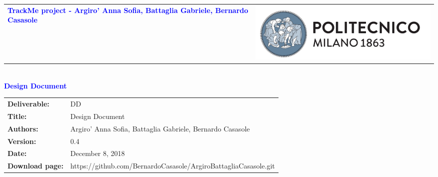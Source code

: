 




\begin{titlepage}


{\begin{table}[t!]
\centering
\begin{tabu} to \textwidth { X[1.3,r,p] X[1.7,l,p] }
\textcolor{Blue}{\textbf{\small{TrackMe project - Argiro' Anna Sofia, Battaglia Gabriele, Bernardo Casasole}}} & \includegraphics[scale=0.5]{images/PolimiLogo}
\end{tabu}
\end{table}}~\\ [7cm]


\centering
{\textcolor{Blue}{\textbf{\Huge{Design Document}}}} \\ [1cm]

\end{titlepage}

\begin{table}[h!]
\begin{tabu} to \textwidth { X[0.3,r,p] X[0.7,l,p] }
\hline

\textbf{Deliverable:} & DD\\
\textbf{Title:} & Design Document \\
\textbf{Authors:} & Argiro' Anna Sofia, Battaglia Gabriele, Bernardo Casasole \\
\textbf{Version:} & 0.4 \\
\textbf{Date:} & December 8, 2018 \\
\textbf{Download page:} & https://github.com/BernardoCasasole/ArgiroBattagliaCasasole.git \\
\hline
\end{tabu}
\end{table}

\setcounter{page}{2}

\newpage
{}
\tableofcontents

